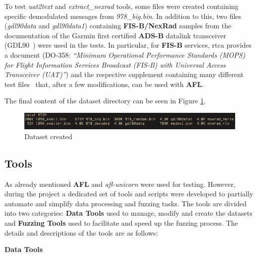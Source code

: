 \documentclass[../main.tex]{subfiles}
\begin{document}
To test \textit{uat2text} and \textit{extract\_nexrad} tools, some files were
created containing specific demodulated messages from \textit{978\_big.bin}. In
addition to this, two files (\textit{gdl90data} and \textit{gdl90data1})
containing \textbf{FIS-B/NexRad} samples from the documentation of the Garmin
first certified \textbf{ADS-B} datalink transceiver (GDL90~\cite{gdl90}) were
used in the tests. In particular, for \textbf{FIS-B} services, \acrshort{rtca}
provides a document (DO-358: \emph{``Minimum Operational Performance Standards
(MOPS) for Flight Information Services Broadcast (FIS-B) with Universal Access
Transceiver (UAT)''}) and the respective supplement containing many different
test files~\cite{do358} that, after a few modifications, can be used with
\textbf{AFL}.

The final content of the dataset directory can be seen in Figure \ref{fig:dataset}.

\begin{figure}[htp]
  \centering
  \includegraphics[scale=0.74]{images/dataset.png}
  \caption{Dataset created}
  \label{fig:dataset}
\end{figure}

\subsection{Tools}
\label{sec:tools}

As already mentioned \textbf{AFL} and \textit{afl-unicorn} were used for testing. However, during the project a dedicated set of tools and scripts were developed to partially automate and simplify data processing and fuzzing tasks.
The tools are divided into two categories: \textbf{Data Tools} used to manage, modify and create the datasets and \textbf{Fuzzing Tools} used to facilitate and speed up the fuzzing process. The details and descriptions of the tools are as follows:
\bigskip

\textbf{Data Tools}
\end{document}
